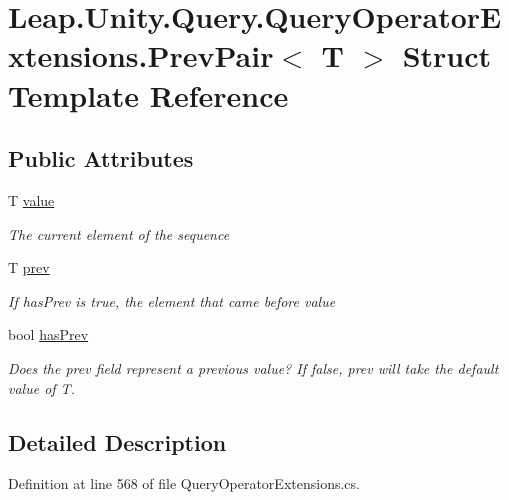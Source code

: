 \hypertarget{struct_leap_1_1_unity_1_1_query_1_1_query_operator_extensions_1_1_prev_pair}{}\section{Leap.\+Unity.\+Query.\+Query\+Operator\+Extensions.\+Prev\+Pair$<$ T $>$ Struct Template Reference}
\label{struct_leap_1_1_unity_1_1_query_1_1_query_operator_extensions_1_1_prev_pair}
\subsection*{Public Attributes}
\begin{DoxyCompactItemize}
\item 
T \mbox{\hyperlink{struct_leap_1_1_unity_1_1_query_1_1_query_operator_extensions_1_1_prev_pair_a01956bf6e655db87578d104e252986e8}{value}}
\begin{DoxyCompactList}\small\item\em The current element of the sequence \end{DoxyCompactList}\item 
T \mbox{\hyperlink{struct_leap_1_1_unity_1_1_query_1_1_query_operator_extensions_1_1_prev_pair_a6a09fdadcd8ead3c8050efe331b2117f}{prev}}
\begin{DoxyCompactList}\small\item\em If has\+Prev is true, the element that came before value \end{DoxyCompactList}\item 
bool \mbox{\hyperlink{struct_leap_1_1_unity_1_1_query_1_1_query_operator_extensions_1_1_prev_pair_abfcf170a9dc5649fe180b5e13255e0f6}{has\+Prev}}
\begin{DoxyCompactList}\small\item\em Does the prev field represent a previous value? If false, prev will take the default value of T. \end{DoxyCompactList}\end{DoxyCompactItemize}


\subsection{Detailed Description}


Definition at line 568 of file Query\+Operator\+Extensions.\+cs.



